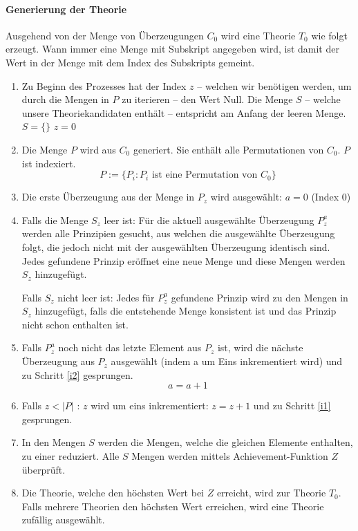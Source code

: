 \documentclass{article}
\begin{document}
\paragraph{Generierung der Theorie}
Ausgehend von der Menge von Überzeugungen $C_0$ wird eine Theorie $T_0$ wie folgt erzeugt. Wann immer eine Menge mit Subskript angegeben wird, ist damit der Wert in der Menge mit dem Index des Subskripts gemeint.
\begin{enumerate}
    \item Zu Beginn des Prozesses hat der Index $z$ -- welchen wir benötigen werden, um durch die Mengen in $P$ zu iterieren -- den Wert Null. Die Menge $S$ -- welche unsere Theoriekandidaten enthält -- entspricht am Anfang der leeren Menge. $S = \{\}$ $z = 0$
    \item Die Menge $P$ wird aus $C_0$ generiert. Sie enthält alle Permutationen von $C_0$. $P$ ist indexiert.
    $$
        P := \{ P_i : P_i \text{ ist eine Permutation von } C_0\}
    $$
    \item \label{i1} Die erste Überzeugung aus der Menge in $P_z$ wird ausgewählt: $a = 0$ (Index 0)
    \item \label{i2} Falls die Menge $S_z$ leer ist: Für die aktuell ausgewählte Überzeugung $P_z^a$ werden alle Prinzipien gesucht, aus welchen die ausgewählte Überzeugung folgt, die jedoch nicht mit der ausgewählten Überzeugung identisch sind. Jedes gefundene Prinzip eröffnet eine neue Menge und diese Mengen werden $S_z$ hinzugefügt.
    
    Falls $S_z$ nicht leer ist: Jedes für $P_z^a$ gefundene Prinzip wird zu den Mengen in $S_z$ hinzugefügt, falls die entstehende Menge konsistent ist und das Prinzip nicht schon enthalten ist.
    \item \label{i3} Falls $P_z^a$ noch nicht das letzte Element aus $P_z$ ist, wird die nächste Überzeugung aus $P_z$ ausgewählt (indem a um Eins inkrementiert wird) und zu Schritt \ref{i2} gesprungen.
    $$
        a = a + 1
    $$
    \item \label{i4} Falls $z < \lvert P \rvert$ : $z$ wird um eins inkrementiert: $z = z + 1$ und zu Schritt \ref{i1} gesprungen.
    \item \label{i5} In den Mengen $S$ werden die Mengen, welche die gleichen Elemente enthalten, zu einer reduziert. Alle $S$ Mengen werden mittels Achievement-Funktion $Z$ überprüft.
    \item \label{i6} Die Theorie, welche den höchsten Wert bei $Z$ erreicht, wird zur Theorie $T_0$. Falls mehrere Theorien den höchsten Wert erreichen, wird eine Theorie zufällig ausgewählt.
\end{enumerate}
\end{document}
